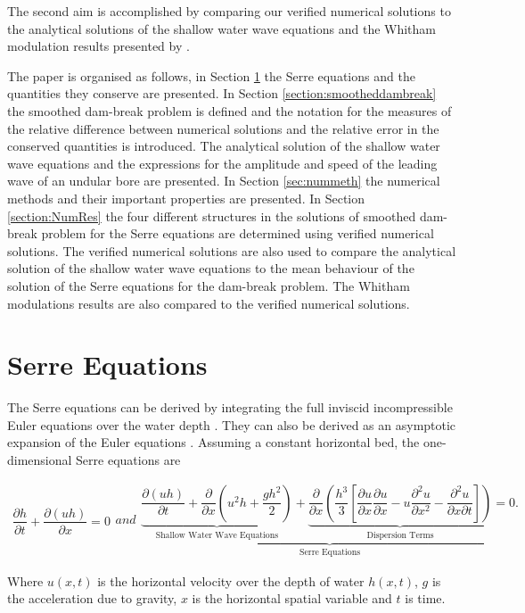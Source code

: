 \documentclass[times]{elsarticle}
\begin{document}
The second aim is accomplished by comparing our verified numerical solutions to the analytical solutions of the shallow water wave equations and the Whitham modulation results presented by \citet{El-etal-2006}. 
 
The paper is organised as follows, in Section \ref{section:Serre Equations} the Serre equations and the quantities they conserve are presented. In Section \ref{section:smootheddambreak} the smoothed dam-break problem is defined and the notation for the measures of the relative difference between numerical solutions and the relative error in the conserved quantities is introduced. The analytical solution of the shallow water wave equations and the expressions for the amplitude and speed of the leading wave of an undular bore are presented. In Section \ref{sec:nummeth} the numerical methods and their important properties are presented. In Section \ref{section:NumRes} the four different structures in the solutions of smoothed dam-break problem for the Serre equations are determined using verified numerical solutions. The verified numerical solutions are also used to compare the analytical solution of the shallow water wave equations to the mean behaviour of the solution of the Serre equations for the dam-break problem. The Whitham modulations results are also compared to the verified numerical solutions.

\section{Serre Equations}
\label{section:Serre Equations}
The Serre equations can be derived by integrating the full inviscid incompressible Euler equations over the water depth \cite{Su-Gardener-1969-536}. They can also be derived as an asymptotic expansion of the Euler equations \cite{Bonneton-Lannes-2009-16601}. Assuming a constant horizontal bed, the one-dimensional Serre equations are \cite{Guyenne-etal-2014-169}
\begin{linenomath*}
\begin{subequations}\label{eq:Serre_nonconservative_form}
\begin{gather}
\dfrac{\partial h}{\partial t} + \dfrac{\partial (uh)}{\partial x} = 0
\label{eq:Serre_continuity}
\end{gather}
and
\begin{gather}
\underbrace{\underbrace{\dfrac{\partial (uh)}{\partial t} + \dfrac{\partial}{\partial x} \left ( u^2h + \dfrac{gh^2}{2}\right )}_{\text{Shallow Water Wave Equations}} + \underbrace{\dfrac{\partial}{\partial x} \left (  \dfrac{h^3}{3} \left [ \dfrac{\partial u }{\partial x} \dfrac{\partial u}{\partial x} - u\dfrac{\partial^2 u}{\partial x^2}  - \dfrac{\partial^2 u}{\partial x \partial t}\right ] \right )}_{\text{Dispersion Terms}} = 0.}_{\text{Serre Equations}}
\label{eq:Serre_momentum}
\end{gather}
\end{subequations}
\end{linenomath*}
Where $u(x,t)$ is the horizontal velocity over the depth of water $h(x,t)$, $g$ is the acceleration due to gravity, $x$ is the horizontal spatial variable and $t$ is time. 
\end{document}
